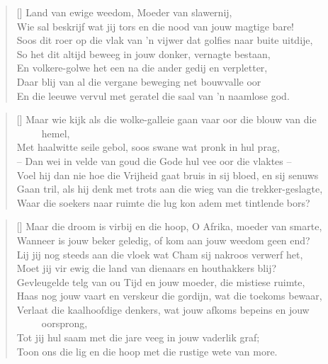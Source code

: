\begin{verse}[\versewidth]
Land van ewige weedom, Moeder van slawernij, \\ 
Wie sal beskrijf wat jij tors en die nood van jouw magtige bare! \\ 
Soos dit roer op die vlak van ’n vijwer dat golfies naar buite uitdije, \\ 
So het dit altijd beweeg in jouw donker, vernagte bestaan, \\ 
En volkere-golwe het een na die ander gedij en verpletter, \\ 
Daar blij van al die vergane beweging net bouwvalle oor \\ 
En die leeuwe vervul met geratel die saal van ’n naamlose god. \\ 
\end{verse}

\begin{verse}[\versewidth]
Maar wie kijk als die wolke-galleie gaan vaar oor die blouw van die \\ 
\ \ \ \ \ hemel, \\ 
Met haalwitte seile gebol, soos swane wat pronk in hul prag, \\ 
-- Dan wei in velde van goud die Gode hul vee oor die vlaktes --  \\ 
Voel hij dan nie hoe die Vrijheid gaat bruis in sij bloed, en sij senuws \\ 
Gaan tril, als hij denk met trots aan die wieg van die trekker-geslagte, \\ 
Waar die soekers naar ruimte die lug kon adem met tintlende bors? \\ 
\end{verse}

\begin{verse}[\versewidth]
Maar die droom is virbij en die hoop, O Afrika, moeder van smarte, \\ 
Wanneer is jouw beker geledig, of kom aan jouw weedom geen end? \\ 
Lij jij nog steeds aan die vloek wat Cham sij nakroos verwerf het, \\ 
Moet jij vir ewig die land van dienaars en houthakkers blij? \\ 
Gevleugelde telg van ou Tijd en jouw moeder, die mistiese ruimte, \\ 
Haas nog jouw vaart en verskeur die gordijn, wat die toekoms bewaar, \\ 
Verlaat die kaalhoofdige denkers, wat jouw afkoms bepeins en jouw \\ 
\ \ \ \ \ oorsprong, \\ 
Tot jij hul saam met die jare veeg in jouw vaderlik graf; \\ 
Toon ons die lig en die hoop met die rustige wete van more. \\ 
\end{verse}